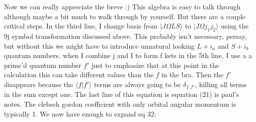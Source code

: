 \documentclass[prl, longbibliography]{revtex4-2}
\begin{document}
Now we can really appreciate the breve :) This algebra is easy to talk through although maybe a bit much to walk through by yourself. But there are a couple critical steps. In the third line, I change basis from $|J\Omega L S\rangle$ to $|J\Omega j_1 j_2\rangle$ using the 9j symbol transformation discussed above. This probably isn't necessary, persay, but without this we might have to introduce unnatural looking $L+i_a$ and $S+i_b$ quantum numbers. when I combine j and I to form f kets in the 5th line, I use a a prime'd quantum number $f'$ just to emphasize that at this point in the calculation this can take different values than the $f$ in the bra. Then the $f'$ disappears because the $\langle f|f'\rangle$ terms are always going to be $\delta_{f,f'}$, killing all terms in the sum except one. The last line of this equation is equation (21) is paul's notes. The clebsch gordon coefficient with only orbital angular momentum is typically 1. We now have enough to expand eq 32:
\end{document}

